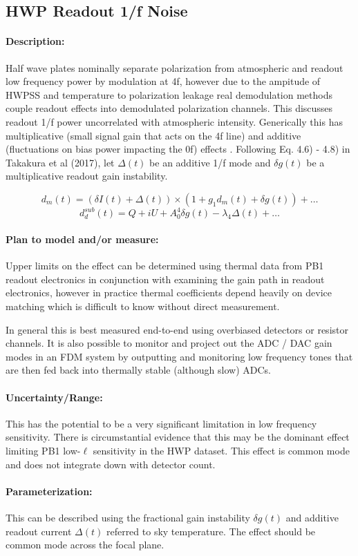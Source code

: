 
\subsection{HWP Readout 1/f Noise}


\paragraph{Description:}
Half wave plates nominally separate polarization from atmospheric and readout low frequency power by modulation at 4f, however due to the ampitude of HWPSS and temperature to polarization leakage real demodulation methods couple readout effects into demodulated polarization channels. 
This discusses readout 1/f power uncorrelated with atmospheric intensity. Generically this has multiplicative (small signal gain that acts on the 4f line) and additive (fluctuations on bias power impacting the 0f) effects . Following Eq. 4.6) - 4.8) in Takakura et al (2017), let $\Delta(t)$ be an additive 1/f mode and $\delta g(t)$ be a multiplicative readout gain instability.

$$
d_{m}(t) = (\delta I (t) + \Delta (t)) \times (1 + g_{1}d_{m}(t) + \delta g(t)) + …
$$
$$
d_{d}^{sub}(t) = Q + iU + A_{0}^{4} \delta g(t) - \lambda_{4} \Delta (t) + …
$$

\paragraph{Plan to model and/or measure:}
Upper limits on the effect can be determined using thermal data from PB1 readout electronics in conjunction with examining the gain path in readout electronics, however in practice thermal coefficients depend heavily on device matching which is difficult to know without direct measurement.

In general this is best measured end-to-end using overbiased detectors or resistor channels. It is also possible to monitor and project out the ADC / DAC gain modes in an FDM system by outputting and monitoring low frequency tones that are then fed back into thermally stable (although slow) ADCs.

\paragraph{Uncertainty/Range:}

This has the potential to be a very significant limitation in low frequency sensitivity. There is circumstantial evidence that this may be the dominant effect limiting PB1 low-$\ell$ sensitivity in the HWP dataset. This effect is common mode and does not integrate down with detector count.

\paragraph{Parameterization:}

This can be described using the fractional gain instability $\delta g(t)$ and additive readout current $\Delta (t)$ referred to sky temperature. The effect should be common mode across the focal plane.
